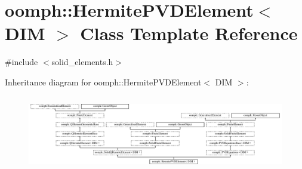\hypertarget{classoomph_1_1HermitePVDElement}{}\section{oomph\+:\+:Hermite\+P\+V\+D\+Element$<$ D\+IM $>$ Class Template Reference}
\label{classoomph_1_1HermitePVDElement}


{\ttfamily \#include $<$solid\+\_\+elements.\+h$>$}

Inheritance diagram for oomph\+:\+:Hermite\+P\+V\+D\+Element$<$ D\+IM $>$\+:\begin{figure}[H]
\begin{center}
\leavevmode
\includegraphics[height=3.336170cm]{classoomph_1_1HermitePVDElement}
\end{center}
\end{figure}
